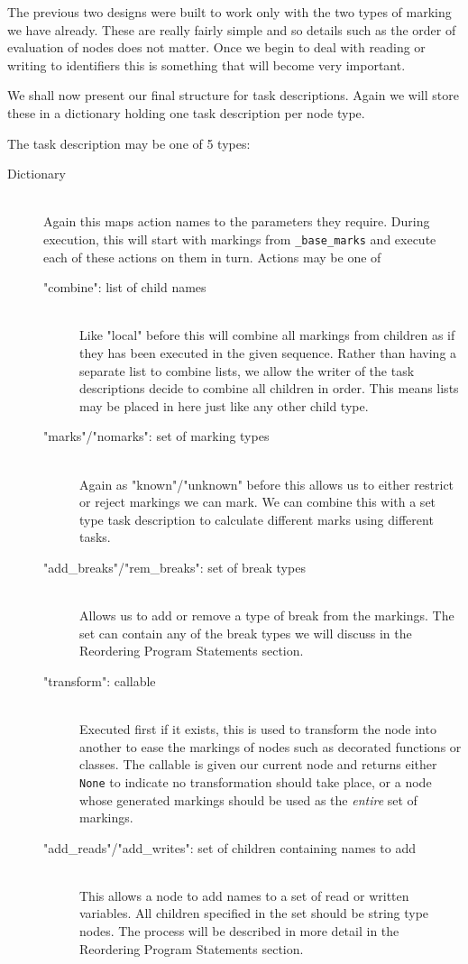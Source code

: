 \documentclass{report}
\begin{document}
The previous two designs were built to work only with the two types of marking we have already. These are really fairly simple and so details such
as the order of evaluation of nodes does not matter. Once we begin to deal with reading or writing to identifiers this is something that will become
very important.
 
We shall now present our final structure for task descriptions. Again we will store these in a dictionary holding one task description per node type.

The task description may be one of 5 types:

\begin{description}
\item[Dictionary] \hfill \\
Again this maps action names to the parameters they require. During execution, this will start with markings from \texttt{\_base\_marks} and
execute each of these actions on them in turn. Actions may be one of

\begin{description}
  \item["combine": list of child names] \hfill \\
  Like "local" before this will combine all markings from children as if they has been executed in the given sequence. Rather than having a
  separate list to combine lists, we allow the writer of the task descriptions decide to combine all children in order. This means lists may
  be placed in here just like any other child type.
  \item["marks"/"nomarks": set of marking types] \hfill \\
  Again as "known"/"unknown" before this allows us to either restrict or reject markings we can mark. We can combine this with a set type task
  description to calculate different marks using different tasks.
  \item["add\_breaks"/"rem\_breaks": set of break types] \hfill \\
  Allows us to add or remove a type of break from the markings. The set can contain any of the break types we will discuss in the Reordering
  Program Statements section.
  \item["transform": callable] \hfill \\
  Executed first if it exists, this is used to transform the node into another to ease the markings of nodes such as decorated functions or
  classes. The callable is given our current node and returns either \texttt{None} to indicate no transformation should take place, or a
  node whose generated markings should be used as the \textit{entire} set of markings.
  \item["add\_reads"/"add\_writes": set of children containing names to add] \hfill \\
  This allows a node to add names to a set of read or written variables. All children specified in the set should be string type nodes. The process
  will be described in more detail in the Reordering Program Statements section.
\end{description}


\end{description}
\end{document}
